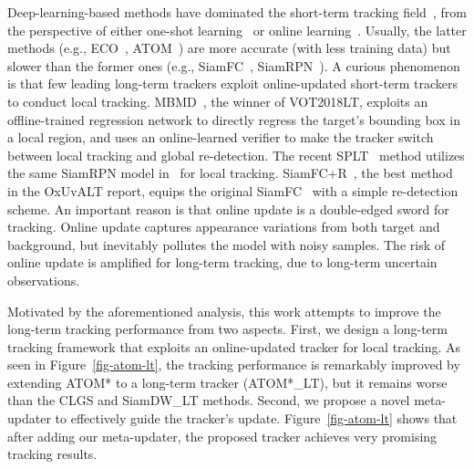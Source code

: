 \documentclass[10pt,twocolumn,letterpaper]{article}
\begin{document}
Deep-learning-based methods have dominated the short-term tracking field~\cite{DVT-Review,CSA-CVPR2020,DVT-NEW},
from the perspective of either one-shot
learning~\cite{SINT,SiameseFC,SASiam,SiameseRPN,SiamRPNplus,CascadedSiameseRPN,SiameseDW,GradNet}
or online learning~\cite{Nam-CVPR16-MDNet,CCOT,Danelljan-CVPR17-ECO,RTMDNet,DRT,ASRCF,CPF-TIP19,MCPF-TPAMI19,Danelljan-CVPR19-ATOM}.
Usually, the latter methods (e.g., ECO~\cite{Danelljan-CVPR17-ECO}, ATOM~\cite{Danelljan-CVPR19-ATOM})
are more accurate (with less training data) but slower than the former ones (e.g., SiamFC~\cite{SiameseFC},
SiamRPN~\cite{SiameseRPN}).
A curious phenomenon is that few leading long-term trackers exploit online-updated short-term
trackers to conduct local tracking.
MBMD~\cite{Zhang-VOT18-MBMD}, the winner of VOT2018LT, exploits an offline-trained
regression network to directly regress the target's bounding box in a local region, and uses an
online-learned verifier to make the tracker switch between local tracking and global re-detection.
The recent SPLT~\cite{Yan-ICCV19-SPLT} method utilizes the same SiamRPN model
in~\cite{Zhang-VOT18-MBMD} for local tracking.
SiamFC+R~\cite{OxUvA}, the best method in the OxUvALT report, equips the
original SiamFC~\cite{SiameseFC} with a simple re-detection scheme.
An important reason is that online update is a double-edged sword for tracking.
Online update captures appearance variations from both target and background,
but inevitably pollutes the model with noisy samples.
The risk of online update is amplified for long-term tracking, due to long-term uncertain observations.

Motivated by the aforementioned analysis, this work attempts to improve the long-term tracking performance
from two aspects.
First, we design a long-term tracking framework that exploits an online-updated tracker for local tracking.
As seen in Figure~\ref{fig-atom-lt}, the tracking performance is remarkably improved by extending
ATOM* to a long-term tracker (ATOM*\_LT), but it remains worse than the CLGS and SiamDW\_LT
methods.
Second, we propose a novel meta-updater to effectively guide the tracker's update.
Figure~\ref{fig-atom-lt} shows that after adding our meta-updater, the proposed tracker achieves very
promising tracking results.
\end{document}
